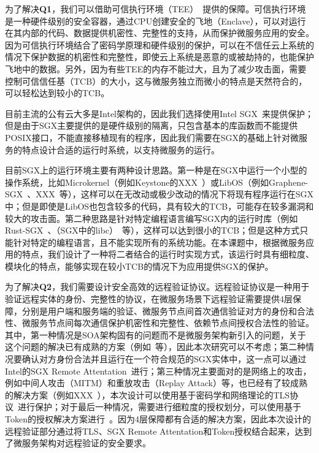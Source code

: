 为了解决\textbf{Q1}，我们可以借助可信执行环境（TEE）~\cite{}提供的保障。可信执行环境是一种硬件级别的安全容器，通过CPU创建安全的飞地（Enclave），可以对运行在其内部的代码、数据提供机密性、完整性的支持，从而保护微服务应用的安全。因为可信执行环境结合了密码学原理和硬件级别的保护，可以在不信任云上系统的情况下保护数据的机密性和完整性，即使云上系统是恶意的或被劫持的，也能保护飞地中的数据。另外，因为有些TEE的内存不能过大，且为了减少攻击面，需要控制可信信任基（TCB）的大小，这与微服务独立而微小的特点是天然符合的，可以轻松达到较小的TCB。

目前主流的公有云大多是Intel架构的，因此我们选择使用Intel SGX~\cite{}来提供保护；但是由于SGX主要提供的是硬件级别的隔离，只包含基本的库函数而不能提供POSIX接口，不能直接移植现有的程序，因此我们需要在SGX的基础上针对微服务的特点设计合适的运行时系统，以支持微服务的运行。

目前SGX上的运行环境主要有两种设计思路。第一种是在SGX中运行一个小型的操作系统，比如Microkernel（例如Keystone的XXX~\cite{}）或LibOS（例如Graphene-SGX~\cite{}、XXX~\cite{}等），这样可以在无改动或极少改动的情况下将现有程序运行在SGX中；但是即使是LibOS也包含较多的代码，具有较大的TCB，可能存在较多漏洞和较大的攻击面。第二种思路是针对特定编程语言编写SGX内的运行时库（例如Rust-SGX~\cite{}、（SGX中的libc）~\cite{}等），这样可以达到很小的TCB；但是这种方式只能针对特定的编程语言，且不能实现所有的系统功能。在本课题中，根据微服务应用的特点，我们设计了一种将二者结合的运行时实现方式，该运行时具有细粒度、模块化的特点，能够实现在较小TCB的情况下为应用提供SGX的保护。

为了解决\textbf{Q2}，我们需要设计安全高效的远程验证协议。远程验证协议是一种用于验证远程实体的身份、完整性的协议，在微服务场景下远程验证需要提供4层保障，分别是用户端和服务端的验证、微服务节点间首次通信验证对方的身份和合法性、微服务节点间每次通信保护机密性和完整性、依赖节点间授权合法性的验证。其中，第一种情况是SOA架构固有的问题而不是微服务架构新引入的问题，关于这个问题的解决已有成熟的方案（例如~\cite{}等），因此本次研究可以不考虑；第二种情况要确认对方身份合法并且运行在一个符合规范的SGX实体中，这一点可以通过Intel的SGX Remote Attentation~\cite{}进行；第三种情况主要面对的是网络上的攻击，例如中间人攻击（MITM）和重放攻击（Replay Attack）等，也已经有了较成熟的解决方案（例如XXX~\cite{}），本次设计可以使用基于密码学和网络理论的TLS协议~\cite{}进行保护；对于最后一种情况，需要进行细粒度的授权划分，可以使用基于Token的授权解决方案进行~\cite{}。因为4层保障都有合适的解决方案，因此本次设计的远程验证部分通过将TLS、SGX Remote Attentation和Token授权结合起来，达到了微服务架构对远程验证的安全要求。

